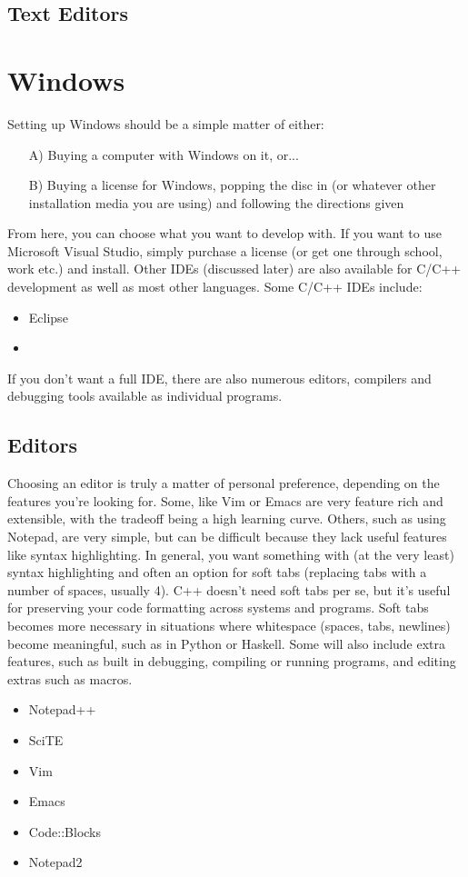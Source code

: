 \documentclass[12pt]{book}
\begin{document}
			\subsection{Text Editors}
				
		\section{Windows}
			Setting up Windows should be a simple matter of either:\begin{itemize}
				\item[A)] Buying a computer with Windows on it, or...
				\item[B)] Buying a license for Windows, popping the disc in (or whatever other installation media you are using) and following the directions given
			\end{itemize}			
			
			From here, you can choose what you want to develop with.  If you want to use Microsoft Visual Studio, simply purchase a license (or get one through school, work etc.) and install.  Other IDEs (discussed later) are also available for C/C++ development as well as most other languages.  Some C/C++ IDEs include: \begin{itemize}
				\item Eclipse
				\item %
			\end{itemize}
			
			If you don't want a full IDE, there are also numerous editors, compilers and debugging tools available as individual programs.
			\subsection{Editors}
				Choosing an editor is truly a matter of personal preference, depending on the features you're looking for.  Some, like Vim or Emacs are very feature rich and extensible, with the tradeoff being a high learning curve.  Others, such as using Notepad, are very simple, but can be difficult because they lack useful features like syntax highlighting.  In general, you want something with (at the very least) syntax highlighting and often an option for soft tabs (replacing tabs with a number of spaces, usually 4).  C++ doesn't need soft tabs per se, but it's useful for preserving your code formatting across systems and programs.  Soft tabs becomes more necessary in situations where whitespace (spaces, tabs, newlines) become meaningful, such as in Python or Haskell.  Some will also include extra features, such as built in debugging, compiling or running programs, and editing extras such as macros.
				\begin{itemize}
					\item Notepad++
					\item SciTE
					\item Vim
					\item Emacs
					\item Code::Blocks
					\item Notepad2
				\end{itemize}
\end{document}
